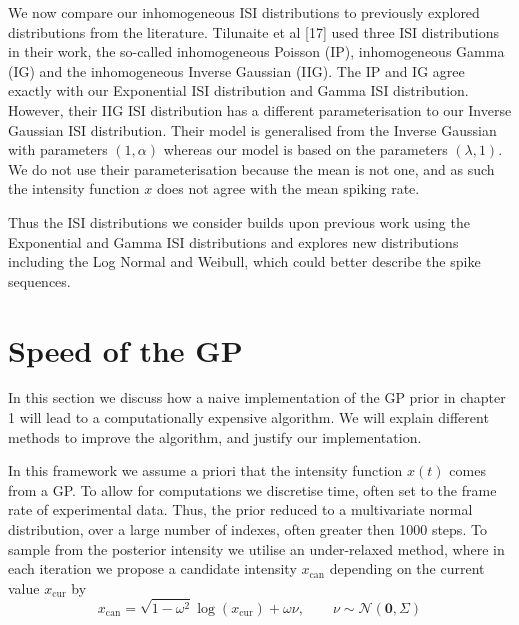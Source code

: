 \documentclass[../main.tex]{subfiles}
\begin{document}

We now compare our inhomogeneous ISI distributions to previously explored distributions from the literature. 
Tilunaite et al [17]
 used three ISI distributions in their work, the so-called inhomogeneous Poisson (IP), inhomogeneous Gamma (IG) and the inhomogeneous Inverse Gaussian (IIG). The IP and IG agree exactly with our Exponential ISI distribution and Gamma ISI distribution. However, their IIG ISI distribution has a different parameterisation to our Inverse Gaussian ISI distribution. Their model is generalised from the Inverse Gaussian with parameters $(1,\alpha)$ whereas our model is based on the parameters $(\lambda ,1)$. We do not use their parameterisation because the mean is not one, and as such the intensity function $x$ does not agree with the mean spiking rate. 

Thus the ISI distributions we consider builds upon previous work using the Exponential and Gamma ISI distributions and explores new distributions including the Log Normal and Weibull, which could better describe the  spike sequences.   

\pagebreak

\section{Speed of the GP}
In this section we discuss how a naive implementation of the GP prior in chapter 1 will lead to a computationally expensive algorithm. We will explain different methods to improve the algorithm, and justify our implementation.
 
In this framework we assume a priori that the intensity function $x(t)$ comes from a GP. To allow for computations we discretise time, often set to the frame rate of experimental data. Thus, the prior reduced to a multivariate normal distribution, over a large number of indexes, often greater then 1000 steps. To sample from the posterior intensity we utilise an under-relaxed method, where in each iteration we propose a candidate intensity $x_{\mathrm{can}}$ depending on the current value $x_{\mathrm{cur}}$ by
$$
x_{\mathrm{can}} = \sqrt{1-\omega^2} \log \left(x_{\mathrm{cur}} \right) +  \omega \nu , \qquad \nu \sim \mathcal{N}\left( \mathbf{0}, \Sigma \right)
$$ 
\end{document}

